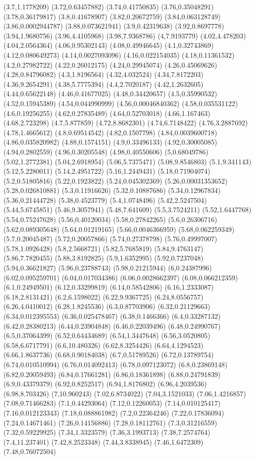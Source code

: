 (3.7,1.1778209) (3.72,0.63457882) (3.74,0.41750835) (3.76,0.35048291) (3.78,0.36179817) (3.8,0.41678907) (3.82,0.20672759) (3.84,0.063128749) (3.86,0.0002944787) (3.88,0.073621941) (3.9,0.42319638) (3.92,0.8697778) (3.94,1.9680756) (3.96,4.4105968) (3.98,7.9368786) (4,7.9193779) (4.02,4.478203) (4.04,2.0564364) (4.06,0.95302143) (4.08,0.49946645) (4.1,0.32743869) (4.12,0.080649273) (4.14,0.0027093096) (4.16,0.022154035) (4.18,0.11361532) (4.2,0.27982722) (4.22,0.26012175) (4.24,0.29945074) (4.26,0.45069626) (4.28,0.84796082) (4.3,1.8196564) (4.32,4.032524) (4.34,7.8172203) (4.36,9.2654291) (4.38,5.7775394) (4.4,2.7020187) (4.42,1.2632605) (4.44,0.65622148) (4.46,0.41677025) (4.48,0.34420657) (4.5,0.35990532) (4.52,0.15945389) (4.54,0.044990999) (4.56,0.00046840362) (4.58,0.035531122) (4.6,0.19256255) (4.62,0.27835489) (4.64,0.52703018) (4.66,1.167463) (4.68,2.723298) (4.7,5.877859) (4.72,8.8682301) (4.74,6.7148422) (4.76,3.2887692) (4.78,1.4665612) (4.8,0.69514542) (4.82,0.1507798) (4.84,0.0039600718) (4.86,0.035820982) (4.88,0.1574151) (4.9,0.33496133) (4.92,0.30005085) (4.94,0.2802559) (4.96,0.30205548) (4.98,0.40550606) (5,0.68049786) (5.02,1.2772381) (5.04,2.6918954) (5.06,5.7375471) (5.08,9.8546803) (5.1,9.341143) (5.12,5.2280011) (5.14,2.4951722) (5.16,1.2449431) (5.18,0.71904074) (5.2,0.51805816) (5.22,0.1923822) (5.24,0.045302369) (5.26,0.00031353652) (5.28,0.026810881) (5.3,0.11916626) (5.32,0.10887686) (5.34,0.12967834) (5.36,0.21444728) (5.38,0.4523779) (5.4,1.0748496) (5.42,2.5247504) (5.44,5.6745851) (5.46,9.3057941) (5.48,7.641609) (5.5,3.7524211) (5.52,1.6447768) (5.54,0.75247628) (5.56,0.40120034) (5.58,0.27842265) (5.6,0.26306716) (5.62,0.089305648) (5.64,0.01219165) (5.66,0.0046366959) (5.68,0.062259349) (5.7,0.20045487) (5.72,0.20057866) (5.74,0.27378798) (5.76,0.49997007) (5.78,1.0926428) (5.8,2.5668721) (5.82,5.7685819) (5.84,9.4763147) (5.86,7.7820455) (5.88,3.8192825) (5.9,1.6352995) (5.92,0.7237048) (5.94,0.36621827) (5.96,0.23788743) (5.98,0.21215944) (6,0.24387996) (6.02,0.095259701) (6.04,0.017034386) (6.06,0.0028662397) (6.08,0.066212359) (6.1,0.24949501) (6.12,0.33299819) (6.14,0.58542806) (6.16,1.2333087) (6.18,2.8131421) (6.2,6.1598022) (6.22,9.9367725) (6.24,8.0556757) (6.26,4.0410012) (6.28,1.8245536) (6.3,0.87703906) (6.32,0.21129663) (6.34,0.012395553) (6.36,0.025478467) (6.38,0.1466366) (6.4,0.33287132) (6.42,0.28380213) (6.44,0.23904848) (6.46,0.22039496) (6.48,0.24990767) (6.5,0.37064399) (6.52,0.64434689) (6.54,1.3447648) (6.56,3.0520805) (6.58,6.6717791) (6.6,10.480326) (6.62,8.3254426) (6.64,4.1294523) (6.66,1.8637736) (6.68,0.90184038) (6.7,0.51789526) (6.72,0.13789754) (6.74,0.010510994) (6.76,0.014092413) (6.78,0.097123072) (6.8,0.23869148) (6.82,0.20059493) (6.84,0.17661281) (6.86,0.18361898) (6.88,0.24791839) (6.9,0.43379379) (6.92,0.8252517) (6.94,1.8176802) (6.96,4.2039536) (6.98,8.703426) (7,10.960243) (7.02,6.8734022) (7.04,3.1521033) (7.06,1.4216857) (7.08,0.71466283) (7.1,0.44293064) (7.12,0.12260053) (7.14,0.010125417) (7.16,0.012123343) (7.18,0.088861982) (7.2,0.22364246) (7.22,0.17836094) (7.24,0.14671461) (7.26,0.14156886) (7.28,0.18112761) (7.3,0.31216559) (7.32,0.59229925) (7.34,1.3323579) (7.36,3.1993713) (7.38,7.2574764) (7.4,11.237401) (7.42,8.2523348) (7.44,3.8338945) (7.46,1.6472309) (7.48,0.76072504) 